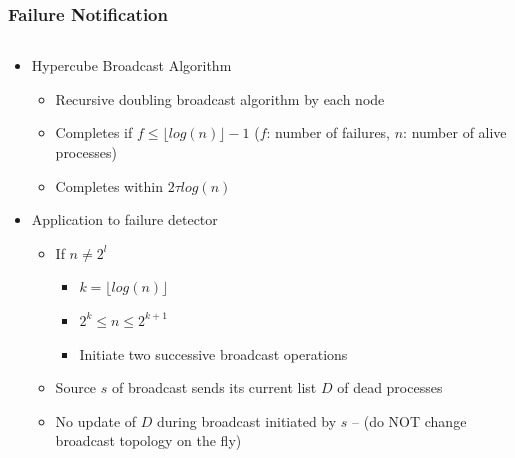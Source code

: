 \begin{frame}
  \frametitle{Failure Notification}

  \begin{columns}
    \begin{column}{0.6\textwidth}
      \begin{itemize}
      \item Hypercube Broadcast Algorithm
        \begin{itemize}
        \item Recursive doubling broadcast algorithm by each node
        \item Completes if $f \leq \lfloor log(n)\rfloor - 1$ ($f$: number of failures, $n$: number of alive processes)
        \item Completes within $2 \tau log(n)$
        \end{itemize}
        \vfill
      \item Application to failure detector
        \begin{itemize}
        \item If $n \neq 2^l$
          \begin{itemize}
          \item $k = \lfloor log(n) \rfloor$ 
          \item $2^k \leq  n  \leq 2^{k+1}$
          \item Initiate two successive broadcast operations
          \end{itemize}
        \item Source $s$ of broadcast sends its current list $D$ of dead processes
        \item {\scriptsize No update of $D$ during broadcast initiated by $s$ -- (do NOT change broadcast topology on the fly)}
        \end{itemize}
      \end{itemize}
    \end{column}


\end{columns}
\end{frame}
